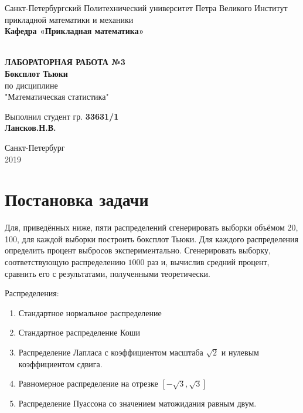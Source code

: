 \documentclass[12pt]{article}
\renewcommand{\listoffigures}{\begingroup %
\tocsection
\tocfile{\listfigurename}{lof}
\endgroup}
\renewcommand{\listoftables}{\begingroup %
\tocsection
\tocfile{\listtablename}{lot}
\endgroup}
\begin{document}
\begin{titlepage}
	\center
		Санкт-Петербургский Политехнический 
		университет Петра Великого
		Институт прикладной математики и механики
		\\ \textbf{Кафедра «Прикладная математика»}

	\vfill ~
	\textbf{
		\\ \large ЛАБОРАТОРНАЯ РАБОТА №3
		\\	\normalsize	
			Боксплот Тьюки
	}
	\\	по дисциплине 
	\\	"Математическая статистика"

	\vfill 

	Выполнил студент гр. \textbf{33631/1} \\
	\textbf{Лансков.Н.В.} \\ 

\vfill

{\large}	Санкт-Петербург
\\ 2019
\end{titlepage}

\tableofcontents
\newpage
\listoffigures{}
\newpage
\listoftables{}
\newpage
\pagebreak


\section{Постановка задачи}
Для, приведённых ниже, пяти распределений сгенерировать выборки объёмом 20, 100, для каждой выборки построить боксплот Тьюки. Для каждого распределения определить процент выбросов экспериментально. Сгенерировать выборку, соответствующую распределению $1000$ раз и, вычислив средний процент, сравнить его с результатами, полученными теоретически.

Распределения:
\begin{enumerate}
\item Стандартное нормальное распределение
\item Стандартное распределение Коши
\item Распределение Лапласа с коэффициентом масштаба $\sqrt{2}$ и нулевым коэффициентом сдвига.
\item Равномерное распределение на отрезке $\left[-\sqrt{3}, \sqrt{3}\right]$
\item Распределение Пуассона со значением матожидания равным двум.
\end{enumerate}
\end{document}
